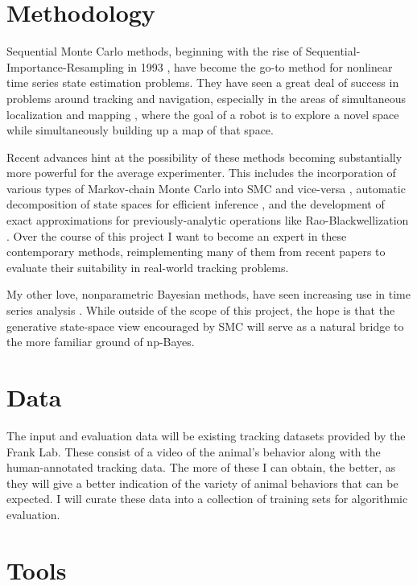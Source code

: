 \documentclass{article}
\begin{document}
\section{Methodology}
Sequential Monte Carlo methods, beginning with the rise of
Sequential-Importance-Resampling in 1993 \cite{Gordon1993}, have become
the go-to method for nonlinear time series state estimation
problems. They have seen a great deal of success in problems around
tracking and navigation, especially in the areas of simultaneous
localization and mapping \cite{FastSLAM2002}, where the goal of a robot is
to explore a novel space while simultaneously building up a map of
that space.

Recent advances hint at the possibility of these methods becoming
substantially more powerful for the average experimenter. This
includes the incorporation of various types of Markov-chain Monte
Carlo into SMC \cite{Gilks2001} and vice-versa \cite{Andrieu2010b},
automatic decomposition of state spaces for efficient inference
\cite{Ahmed2012}, and the development of exact approximations for
previously-analytic operations like Rao-Blackwellization
\cite{JohansenExact2012}. Over the course of this project I want to become an
expert in these contemporary methods, reimplementing many of them from
recent papers to evaluate their suitability in real-world tracking
problems.

My other love, nonparametric Bayesian methods, have seen increasing
use in time series analysis \cite{FoxThesis2009}. While outside of the
scope of this project, the hope is that the generative state-space
view encouraged by SMC will serve as a natural bridge to the more
familiar ground of np-Bayes.

\section{Data}

The input and evaluation data will be existing tracking datasets
provided by the Frank Lab. These consist of a video of the animal's
behavior along with the human-annotated tracking data. The more of
these I can obtain, the better, as they will give a better indication
of the variety of animal behaviors that can be expected. I will curate
these data into a collection of training sets for algorithmic
evaluation.


\section{Tools}
\end{document}
